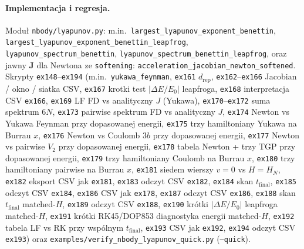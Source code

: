\paragraph{Implementacja i regresja.}
Moduł \texttt{nbody/lyapunov.py}: m.in.\
\texttt{largest\_lyapunov\_exponent\_benettin},
\texttt{largest\_lyapunov\_exponent\_benettin\_leapfrog},
\texttt{lyapunov\_spectrum\_benettin},
\texttt{lyapunov\_spectrum\_benettin\_leapfrog},
oraz jawny $\mathbf J$ dla Newtona ze \texttt{softening}:
\texttt{acceleration\_jacobian\_newton\_softened}.
Skrypty \texttt{ex148}--\texttt{ex194} (m.in.\ \texttt{yukawa\_feynman}, \texttt{ex161} $d_{\mathrm{rep}}$, \texttt{ex162}--\texttt{ex166} Jacobian / okno / siatka CSV, \texttt{ex167} krotki test $|{\Delta E}/{E_0}|$ leapfroga, \texttt{ex168} interpretacja CSV \texttt{ex166}, \texttt{ex169} LF FD vs analityczny $J$ (Yukawa), \texttt{ex170}--\texttt{ex172} suma spektrum $6N$, \texttt{ex173} pairwise spektrum FD vs analityczny $J$, \texttt{ex174} Newton vs Yukawa Feynman przy dopasowanej energii, \texttt{ex175} trzy hamiltoniany Yukawa na Burrau $x$, \texttt{ex176} Newton vs Coulomb $3b$ przy dopasowanej energii, \texttt{ex177} Newton vs pairwise $V_2$ przy dopasowanej energii, \texttt{ex178} tabela Newton + trzy TGP przy dopasowanej energii, \texttt{ex179} trzy hamiltoniany Coulomb na Burrau $x$, \texttt{ex180} trzy hamiltoniany pairwise na Burrau $x$, \texttt{ex181} siedem wierszy $v{=}0$ vs $H{=}H_N$, \texttt{ex182} eksport CSV jak \texttt{ex181}, \texttt{ex183} odczyt CSV \texttt{ex182}, \texttt{ex184} skan $t_{\mathrm{final}}$, \texttt{ex185} odczyt CSV \texttt{ex184}, \texttt{ex186} CSV jak \texttt{ex178}, \texttt{ex187} odczyt CSV \texttt{ex186}, \texttt{ex188} skan $t_{\mathrm{final}}$ matched-$H$, \texttt{ex189} odczyt CSV \texttt{ex188}, \texttt{ex190} krótki $|{\Delta E}/{E_0}|$ leapfroga matched-$H$, \texttt{ex191} krótki RK45/DOP853 diagnostyka energii matched-$H$, \texttt{ex192} tabela LF vs RK przy wspólnym $t_{\mathrm{final}}$, \texttt{ex193} CSV jak \texttt{ex192}, \texttt{ex194} odczyt CSV \texttt{ex193}) oraz
\texttt{examples/verify\_nbody\_lyapunov\_quick.py} (\texttt{--quick}).
